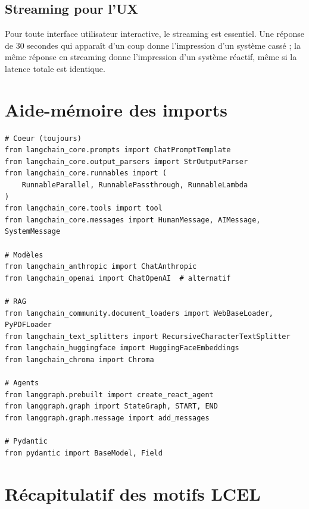 \documentclass[11pt,a4paper]{article}
\begin{document}
\subsection{Streaming pour l'UX}

Pour toute interface utilisateur interactive, le streaming est essentiel. Une réponse de 30 secondes qui apparaît d'un coup donne l'impression d'un système cassé ; la même réponse en streaming donne l'impression d'un système réactif, même si la latence totale est identique.

\appendix
\section{Aide-mémoire des imports}

\begin{verbatim}
# Coeur (toujours)
from langchain_core.prompts import ChatPromptTemplate
from langchain_core.output_parsers import StrOutputParser
from langchain_core.runnables import (
    RunnableParallel, RunnablePassthrough, RunnableLambda
)
from langchain_core.tools import tool
from langchain_core.messages import HumanMessage, AIMessage, SystemMessage

# Modèles
from langchain_anthropic import ChatAnthropic
from langchain_openai import ChatOpenAI  # alternatif

# RAG
from langchain_community.document_loaders import WebBaseLoader, PyPDFLoader
from langchain_text_splitters import RecursiveCharacterTextSplitter
from langchain_huggingface import HuggingFaceEmbeddings
from langchain_chroma import Chroma

# Agents
from langgraph.prebuilt import create_react_agent
from langgraph.graph import StateGraph, START, END
from langgraph.graph.message import add_messages

# Pydantic
from pydantic import BaseModel, Field
\end{verbatim}

\section{Récapitulatif des motifs LCEL}
\end{document}

